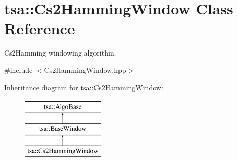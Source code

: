 \hypertarget{classtsa_1_1_cs2_hamming_window}{}\section{tsa\+:\+:Cs2\+Hamming\+Window Class Reference}
\label{classtsa_1_1_cs2_hamming_window}


Cs2\+Hamming windowing algorithm.  




{\ttfamily \#include $<$Cs2\+Hamming\+Window.\+hpp$>$}

Inheritance diagram for tsa\+:\+:Cs2\+Hamming\+Window\+:\begin{figure}[H]
\begin{center}
\leavevmode
\includegraphics[height=3.000000cm]{classtsa_1_1_cs2_hamming_window}
\end{center}
\end{figure}
